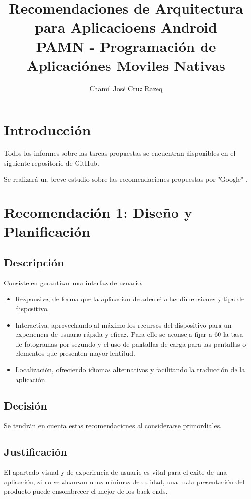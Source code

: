 \documentclass{article}
\title{Recomendaciones de Arquitectura para Aplicacioens Android \\[3ex] \small PAMN - Programación de Aplicaciónes Moviles Nativas}
\author{Chamil José Cruz Razeq}
\begin{document}
    \maketitle
    \thispagestyle{empty}
    \newpage

    \section{Introducción}
        Todos los informes sobre las tareas propuestas se encuentran disponibles en el
         siguiente repositorio de \href{https://github.com/chamilstudy/ulpgc_pamn_assigments}{GitHub}.

        Se realizará un breve estudio sobre las recomendaciones propuestas por "Google" \cite{recomendaciones}.
    
    \section{Recomendación 1: Diseño y Planificación}
        \subsection{Descripción}
        Consiste en garantizar una interfaz de usuario:
            \begin{itemize}
                \item Responsive, de forma que la aplicación de adecué a las dimensiones y tipo de 
                       dispositivo.
                \item Interactiva, aprovechando al máximo los recursos del dispositivo para un experiencia
                       de usuario rápida y eficaz. Para ello se aconseja fijar a 60 la tasa de fotogramas por
                       segundo y el uso de pantallas de carga para las pantallas o elementos que presenten mayor lentitud.
                \item Localización, ofreciendo idiomas alternativos y facilitando la traducción de la aplicación.
            \end{itemize}
            
        \subsection{Decisión}
        Se tendrán en cuenta estas recomendaciones al considerarse primordiales.

        \subsection{Justificación}
        El apartado visual y de experiencia de usuario es vital para el exito de una aplicación, si no se
         alcanzan unos mínimos de calidad, una mala presentación del producto puede ensombrecer el mejor de
         los back-ends.
\end{document}
